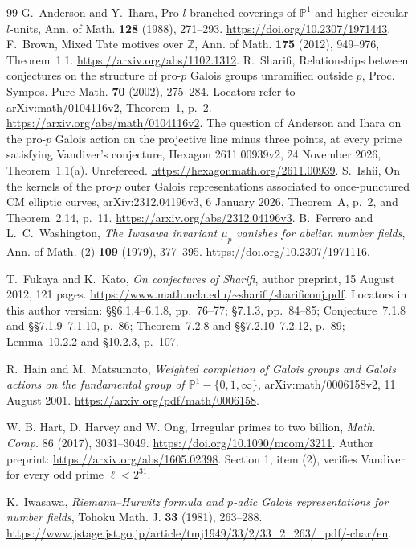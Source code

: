 \documentclass[11pt]{article}
\theoremstyle{definition}\newtheorem{definition}[theorem]{Definition}
\newcommand{\Z}{\mathbb Z}\newcommand{\Q}{\mathbb Q}
\begin{document}
\begin{thebibliography}{99}
G.~Anderson and Y.~Ihara, Pro-$l$ branched coverings of $\mathbb P^1$ and higher circular $l$-units, Ann. of Math. \textbf{128} (1988), 271--293. \url{https://doi.org/10.2307/1971443}.
F.~Brown, Mixed Tate motives over $\Z$, Ann. of Math. \textbf{175} (2012), 949--976, Theorem~1.1. \url{https://arxiv.org/abs/1102.1312}.
R.~Sharifi, Relationships between conjectures on the structure of pro-$p$ Galois groups unramified outside $p$, Proc. Sympos. Pure Math. \textbf{70} (2002), 275--284. Locators refer to arXiv:math/0104116v2, Theorem~1, p.~2. \url{https://arxiv.org/abs/math/0104116v2}.
The question of Anderson and Ihara on the pro-$p$ Galois action on the projective line minus three points, at every prime satisfying Vandiver's conjecture, Hexagon 2611.00939v2, 24 November 2026, Theorem~1.1(a). Unrefereed. \url{https://hexagonmath.org/2611.00939}.
S.~Ishii, On the kernels of the pro-$p$ outer Galois representations associated to once-punctured CM elliptic curves, arXiv:2312.04196v3, 6 January 2026, Theorem~A, p.~2, and Theorem~2.14, p.~11. \url{https://arxiv.org/abs/2312.04196v3}.
B.~Ferrero and L.~C.~Washington,
\emph{The Iwasawa invariant $\mu_p$ vanishes for abelian number fields},
Ann. of Math. (2) \textbf{109} (1979), 377--395.
\url{https://doi.org/10.2307/1971116}.

T.~Fukaya and K.~Kato,
\emph{On conjectures of Sharifi}, author preprint,
15 August 2012, 121 pages.
\url{https://www.math.ucla.edu/~sharifi/sharificonj.pdf}.
Locators in this author version:
\S\S6.1.4--6.1.8, pp.~76--77;
\S7.1.3, pp.~84--85;
Conjecture~7.1.8 and \S\S7.1.9--7.1.10, p.~86;
Theorem~7.2.8 and \S\S7.2.10--7.2.12, p.~89;
Lemma~10.2.2 and \S10.2.3, p.~107.

R.~Hain and M.~Matsumoto, \emph{Weighted completion of Galois groups
and Galois actions on the fundamental group of $\mathbb P^1-\{0,1,\infty\}$},
arXiv:math/0006158v2, 11 August 2001.
\url{https://arxiv.org/pdf/math/0006158}.

W. B. Hart, D. Harvey and W. Ong,
Irregular primes to two billion,
\emph{Math. Comp.} 86 (2017), 3031--3049.
\url{https://doi.org/10.1090/mcom/3211}.
Author preprint:
\url{https://arxiv.org/abs/1605.02398}.
Section 1, item (2), verifies Vandiver for every odd prime
\(\ell<2^{31}\).

K.~Iwasawa, \emph{Riemann--Hurwitz formula and $p$-adic Galois
representations for number fields},
Tohoku Math. J. \textbf{33} (1981), 263--288.
\url{https://www.jstage.jst.go.jp/article/tmj1949/33/2/33_2_263/_pdf/-char/en}.


\end{thebibliography}
\end{document}
